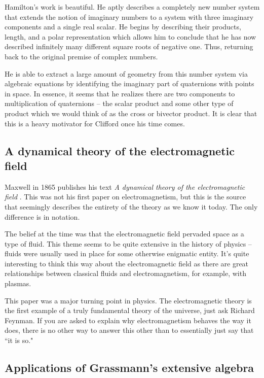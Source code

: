 \documentclass[12pt]{article}
\begin{document}
Hamilton's work is beautiful. He aptly describes a completely new number system that extends the notion of imaginary numbers to a system with three imaginary components and a single real scalar. He begins by describing their products, length, and a polar representation which allows him to conclude that he has now described infinitely many different square roots of negative one. Thus, returning back to the original premise of complex numbers.

He is able to extract a large amount of geometry from this number system via algebraic equations by identifying the imaginary part of quaternions with points in space. In essence, it seems that he realizes there are two components to multiplication of quaternions -- the scalar product and some other type of product which we would think of as the cross or bivector product. It is clear that this is a heavy motivator for Clifford once his time comes.

\newpage
\subsection{A dynamical theory of the electromagnetic field}

Maxwell in 1865 publishes his text \emph{A dynamical theory of the electromagnetic field} \cite{maxwell_1865}. This was not his first paper on electromagnetism, but this is the source that seemingly describes the entirety of the theory as we know it today. The only difference is in notation. 

The belief at the time was that the electromagnetic field pervaded space as a type of fluid. This theme seems to be quite extensive in the history of physics -- fluids were usually used in place for some otherwise enigmatic entity. It's quite interesting to think this way about the electromagnetic field as there are great relationships between classical fluids and electromagnetism, for example, with plasmas.

This paper was a major turning point in physics. The electromagnetic theory is the first example of a truly fundamental theory of the universe, just ask Richard Feynman. If you are asked to explain why electromagnetism behaves the way it does, there is no other way to answer this other than to essentially just say that ``it is so."

\newpage

\subsection{Applications of Grassmann's extensive algebra}
\end{document}
